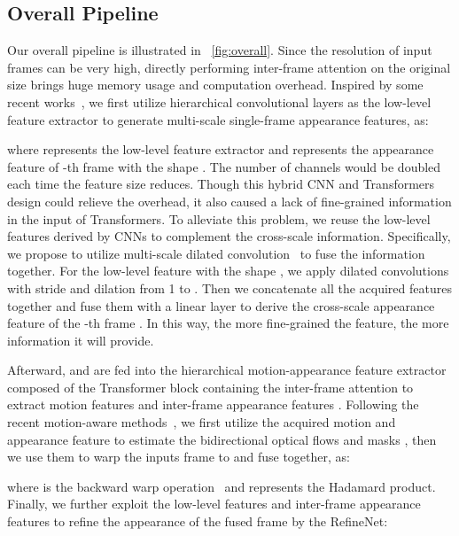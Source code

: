 \documentclass[10pt,twocolumn,letterpaper]{article}
\begin{document}
       
 
        \subsection{Overall Pipeline}
        \label{sec:overall}
        Our overall pipeline is illustrated in ~\cref{fig:overall}. Since the resolution of input frames can be very high, directly performing inter-frame attention on the original size brings huge memory usage and computation overhead. Inspired by some recent works~\cite{wang2022convolutional,xiao2021early,wu2021cvt}, we first utilize hierarchical convolutional layers as the low-level feature extractor to generate multi-scale single-frame  appearance features, as:
        
        where  represents the low-level feature extractor and  represents the appearance feature of -th frame with the shape . The number of channels  would be doubled each time the feature size reduces. Though this hybrid CNN and Transformers design could relieve the overhead, it also caused a lack of fine-grained information in the input of Transformers. To alleviate this problem, we reuse the low-level features derived by CNNs to complement the cross-scale information. Specifically, we propose to utilize multi-scale dilated convolution~\cite{yu2015multi} to fuse the information together. For the low-level feature with the shape , we apply dilated convolutions with stride  and dilation from 1 to . Then we concatenate all the acquired features together and fuse them with a linear layer to derive the cross-scale appearance feature of the -th frame . In this way, the more fine-grained the feature, the more information it will provide.
        
        Afterward,  and  are fed into the hierarchical motion-appearance feature extractor composed of the Transformer block containing the inter-frame attention to extract motion features  and inter-frame appearance features .  Following the recent motion-aware methods~\cite{kong2022ifrnet,huang2020rife,park2021asymmetric,lu2022video}, we first utilize the acquired motion and appearance feature to estimate the bidirectional optical flows  and masks , then we use them to warp the inputs frame to  and fuse together, as:

        where  is the backward warp operation~\cite{huang2020rife} and  represents the Hadamard product. Finally, we further exploit the low-level features and inter-frame appearance features to refine the appearance of the fused frame  by the RefineNet:
        
\end{document}

